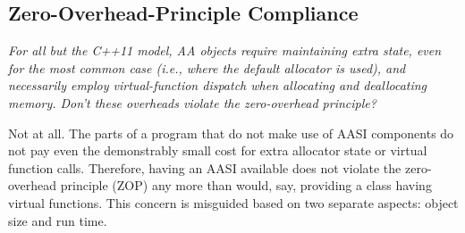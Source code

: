\subsection{Zero-Overhead-Principle Compliance}
\emph{For all but the C++11 model, AA objects require maintaining extra state, even for the
most common case (i.e., where the default allocator is used), and necessarily employ
virtual-function dispatch when allocating and deallocating memory. Don’t these
overheads violate the zero-overhead principle?}

Not at all. The parts of a program that do not make use of AASI components do not
pay even the demonstrably small cost for extra allocator state or virtual function
calls. Therefore, having an AASI available does not violate the zero-overhead
principle (ZOP) any more than would, say, providing a class having virtual functions.
This concern is misguided based on two separate aspects: object size and run time.

